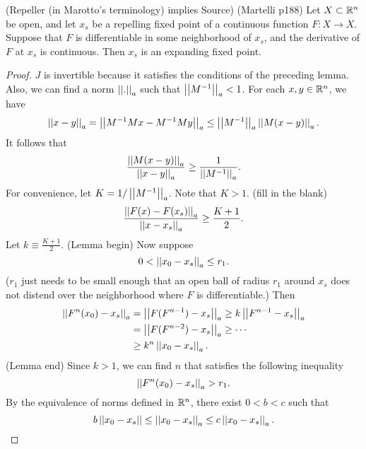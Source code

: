 \documentclass[11pt]{book}
\begin{document}
\begin{proposition}
  (Repeller (in Marotto's terminology) implies Source)
  (Martelli p188)
  Let $X \subset \mathbb{R}^n$ be open, and let $x_s$ be a repelling fixed point
  of a continuous function $F: X \to X$. Suppose that $F$ is
  differentiable in some neighborhood of $x_s$, and the derivative of $F$ at $x_s$ is continuous.
  Then $x_s$ is an expanding fixed point.
\end{proposition}
\begin{proof}
  $J$ is invertible because it satisfies the conditions of the preceding lemma.
  Also, we can find a norm $\left|\left|.\right|\right|_a$ such that $\left|\left|M^{-1}\right|\right|_a < 1$.
  For each $x, y \in \mathbb{R}^n$, we have 
  \begin{equation*}
    \left|\left|x-y\right|\right|_a = \left|\left|M^{-1} M x - M^{-1} M y\right|\right|_a \leq \left|\left|M^{-1}\right|\right|_a \left|\left|M(x - y)\right|\right|_a.
  \end{equation*}
  It follows that 
  \begin{equation*}
    \frac{\left|\left|M(x-y)\right|\right|_a}{\left|\left|x-y\right|\right|_a} \geq \frac{1}{\left|\left|M^{-1}\right|\right|_a}.
  \end{equation*}
  For convenience, let $K = 1/\left|\left|M^{-1}\right|\right|_a$.
  Note that $K > 1$.
  (fill in the blank)
  \begin{equation*}
    \frac{\left|\left|F(x) - F(x_s)\right|\right|_a}{\left|\left|x - x_s\right|\right|_a} \geq \frac{K+1}{2}.
  \end{equation*}
  Let $k \equiv \frac{K+1}{2}$.
  (Lemma begin) Now suppose
  \begin{equation*}
    0 < \left|\left|x_0 - x_s\right|\right|_a \leq r_1.
  \end{equation*}
  ($r_1$ just needs to be small enough that an open ball
  of radius $r_1$ around $x_s$ does not distend over the
  neighborhood where $F$ is differentiable.) Then
  \begin{align*}
    \left|\left|F^n(x_0) - x_s\right|\right|_a &= \left|\left|F(F^{n-1}) - x_s\right|\right|_a \geq k \left|\left|F^{n-1} - x_s\right|\right|_a     \\
    &= \left|\left|F(F^{n-2}) - x_s\right|\right|_a \geq \cdots \\
    &\geq k^n \left|\left|x_0 - x_s\right|\right|_a.
  \end{align*}
  (Lemma end)
  Since $k > 1$, we can find $n$ that satisfies the following inequality
  \begin{equation*}
    \left|\left|F^n(x_0) - x_s\right|\right|_a > r_1.
  \end{equation*}
  By the equivalence of norms defined in $\mathbb{R}^n$, there exist $0 < b < c$ such that 
  \begin{equation*}
    b \norm{x_0 - x_s} \leq \norm{x_0 - x_s}_a \leq c \norm{x_0 - x_s}_a.

\end{equation*}
\end{proof}
\end{document}
